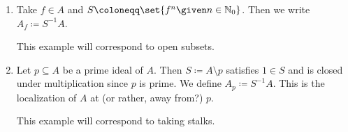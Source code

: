 \begin{enumerate}
	\item Take $f \in A$ and $S\coloneqq \set{f^n\given n \in \mathbb{N}_0}$. Then we write
		$A_f\coloneqq S^{-1}A$.

		This example will correspond to open subsets.
	\item Let $p \subseteq A$ be a prime ideal of $A$. Then $S\coloneqq A\setminus p$
		satisfies $1 \in S$ and is closed under multiplication since  $p$ is
		prime. We define $A_p\coloneqq S^{-1}A$. This is the localization of $A$
		at (or rather, away from?) $p$.

		This example will correspond to taking stalks.
\end{enumerate}
